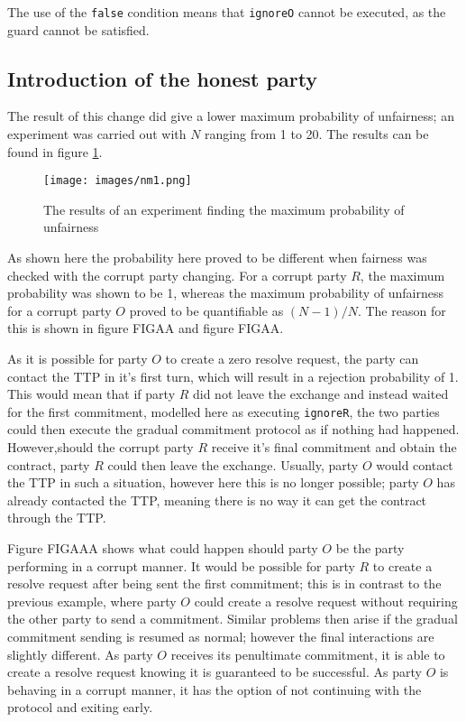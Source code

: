 \documentclass{l4proj}
\begin{document}
The use of the {\tt false} condition means that {\tt ignoreO} cannot be executed, as the guard cannot be satisfied. 

\subsection{Introduction of the honest party}

The result of this change did give a lower maximum probability of unfairness; an experiment was carried out with $N$ ranging from 1 to 20. The results can be found in figure \ref{NM!}.

\begin{figure}[ht!]
\centering
\texttt{[image: images/nm1.png]}
\caption{The results of an experiment finding the maximum probability of unfairness}
\label{NM!}
\end{figure}

As shown here the probability here proved to be different when fairness was checked with the corrupt party changing. For a corrupt party $R$, the maximum probability was shown to be 1, whereas the maximum probability of unfairness for a corrupt party $O$ proved to be quantifiable as $(N-1)/N$. The reason for this is shown in figure FIGAA and figure FIGAA.

As it is possible for party $O$ to create a zero resolve request, the party can contact the TTP in it's first turn, which will result in a rejection probability of 1. This would mean that if party $R$ did not leave the exchange and instead waited for the first commitment, modelled here as executing {\tt ignoreR}, the two parties could then execute the gradual commitment protocol as if nothing had happened. However,should the corrupt party $R$ receive it's final commitment and obtain the contract, party $R$ could then leave the exchange. Usually, party $O$ would contact the TTP in such a situation, however here this is no longer possible; party $O$ has already contacted the TTP, meaning there is no way it can get the contract through the TTP.

Figure FIGAAA shows what could happen should party $O$ be the party performing in a corrupt manner. 
It would be possible for party $R$ to create a resolve request after being sent the first commitment; this is in contrast to the previous example, where party $O$ could create a resolve request without requiring the other party to send a commitment. Similar problems then arise if the gradual commitment sending is resumed as normal; however the final interactions are slightly different. As party $O$ receives its penultimate commitment, it is able to create a resolve request knowing it is guaranteed to be successful. As party $O$ is behaving in a corrupt manner, it has the option of not continuing with the protocol and exiting early.
\end{document}
